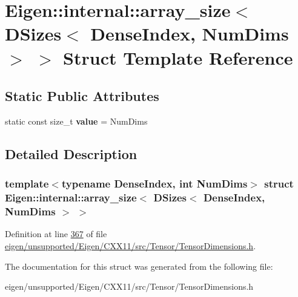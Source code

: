 \hypertarget{struct_eigen_1_1internal_1_1array__size_3_01_d_sizes_3_01_dense_index_00_01_num_dims_01_4_01_4}{}\section{Eigen\+:\+:internal\+:\+:array\+\_\+size$<$ D\+Sizes$<$ Dense\+Index, Num\+Dims $>$ $>$ Struct Template Reference}
\label{struct_eigen_1_1internal_1_1array__size_3_01_d_sizes_3_01_dense_index_00_01_num_dims_01_4_01_4}
\subsection*{Static Public Attributes}
\begin{DoxyCompactItemize}
\item 
\mbox{\label{struct_eigen_1_1internal_1_1array__size_3_01_d_sizes_3_01_dense_index_00_01_num_dims_01_4_01_4_a30848eb12dc57bd42f8d3096c61232cb}} 
static const size\+\_\+t {\bfseries value} = Num\+Dims
\end{DoxyCompactItemize}


\subsection{Detailed Description}
\subsubsection*{template$<$typename Dense\+Index, int Num\+Dims$>$\newline
struct Eigen\+::internal\+::array\+\_\+size$<$ D\+Sizes$<$ Dense\+Index, Num\+Dims $>$ $>$}



Definition at line \hyperlink{eigen_2unsupported_2_eigen_2_c_x_x11_2src_2_tensor_2_tensor_dimensions_8h_source_l00367}{367} of file \hyperlink{eigen_2unsupported_2_eigen_2_c_x_x11_2src_2_tensor_2_tensor_dimensions_8h_source}{eigen/unsupported/\+Eigen/\+C\+X\+X11/src/\+Tensor/\+Tensor\+Dimensions.\+h}.



The documentation for this struct was generated from the following file\+:\begin{DoxyCompactItemize}
\item 
eigen/unsupported/\+Eigen/\+C\+X\+X11/src/\+Tensor/\+Tensor\+Dimensions.\+h\end{DoxyCompactItemize}
